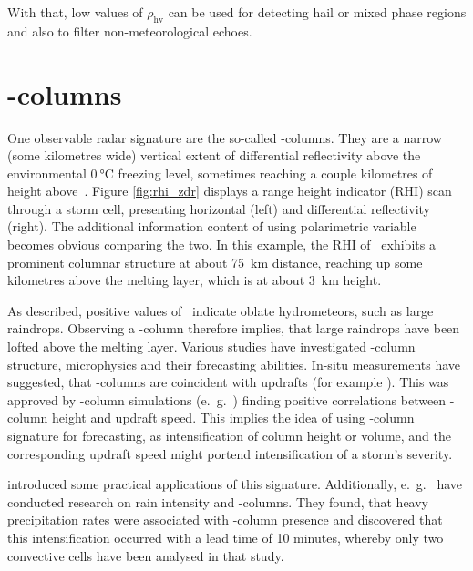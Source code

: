 With that, low values of $\rho_\text{hv}$ can be used for detecting hail or mixed phase regions and also to filter non-meteorological echoes.

\newpage
\section{\zdr-columns}
One observable radar signature are the so-called \zdr-columns. They are a narrow (some kilometres wide) vertical extent of differential reflectivity above the environmental $\SI{0}{\degreeCelsius}$ freezing level, sometimes reaching a couple kilometres of height above~\cite{kumijan2014}. Figure \ref{fig:rhi_zdr} displays a range height indicator (RHI) scan through a storm cell, presenting horizontal (left) and differential reflectivity (right). The additional information content of using polarimetric variable becomes obvious comparing the two. In this example, the RHI of \zdr~exhibits a prominent columnar structure at about \SI{75}{\kilo\metre} distance, reaching up some kilometres above the melting layer, which is at about \SI{3}{\kilo\metre} height.

As described, positive values of \zdr~indicate oblate hydrometeors, such as large raindrops. Observing a \zdr-column therefore implies, that large raindrops have been lofted above the melting layer. 
Various studies have investigated \zdr-column structure, microphysics and their forecasting abilities. In-situ measurements have suggested, that \zdr-columns are coincident with updrafts (for example \textcite{bringiInSituZDR, loneyInSituZDR}). This was approved by \zdr-column simulations (e.\ g.\ \textcite{kumijan2014, snyder, snyderZDRSimulations}) finding positive correlations between \zdr-column height and updraft speed.
This implies the idea of using \zdr-column signature for forecasting, as intensification of column height or volume, and the corresponding updraft speed might portend intensification of a storm's severity. 

\textcite{scharfenbergZDRApplication} introduced some practical applications of this signature.
Additionally, e.\ g.\ \textcite{RadarDerivedStructuralandPrecipitationCharacteristicsofZDRColumnswithinWarmSeasonConvectionovertheUnitedKingdom, adachi2013detection} have conducted research on rain intensity and \zdr-columns. They found, that heavy precipitation rates were associated with \zdr-column presence and \textcite{adachi2013detection} discovered that this intensification occurred with a lead time of 10 minutes, whereby only two convective cells have been analysed in that study.

